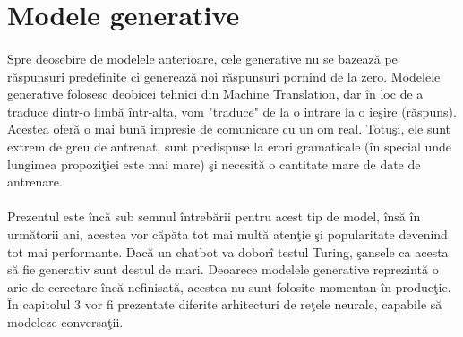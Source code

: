 \section{Modele generative}

\paragraph{}
Spre deosebire de modelele anterioare, cele generative nu se bazeaz\u a pe r\u aspunsuri predefinite ci genereaz\u a noi r\u aspunsuri pornind de la zero. Modelele generative folosesc deobicei tehnici din Machine Translation, dar \^ in loc de a traduce dintr-o limb\u a \^ intr-alta, vom "traduce" de la o intrare la o ie\c sire (r\u aspuns). Acestea ofer\u a o mai bun\u a impresie de comunicare cu un om real. Totu\c si, ele sunt extrem de greu de antrenat, sunt predispuse la erori gramaticale (\^ in special unde lungimea propozi\c tiei este mai mare) \c si necesit\u a o cantitate mare de date de antrenare.

\paragraph{}
Prezentul este \^ inc\u a sub semnul \^ intreb\u arii pentru acest tip de model, \^ ins\u a \^ in urm\u atorii ani, acestea vor c\u ap\u ata tot mai mult\u a aten\c tie \c si popularitate devenind tot mai performante. Dac\u a un chatbot va dobor\^ i testul Turing, \c sansele ca acesta s\u a fie generativ sunt destul de mari. Deoarece modelele generative reprezint\u a o arie de cercetare \^ inc\u a nefinisat\u a, acestea nu sunt folosite momentan \^ in produc\c tie. \^ In capitolul 3 vor fi prezentate diferite arhitecturi de re\c tele neurale, capabile s\u a modeleze conversa\c tii.